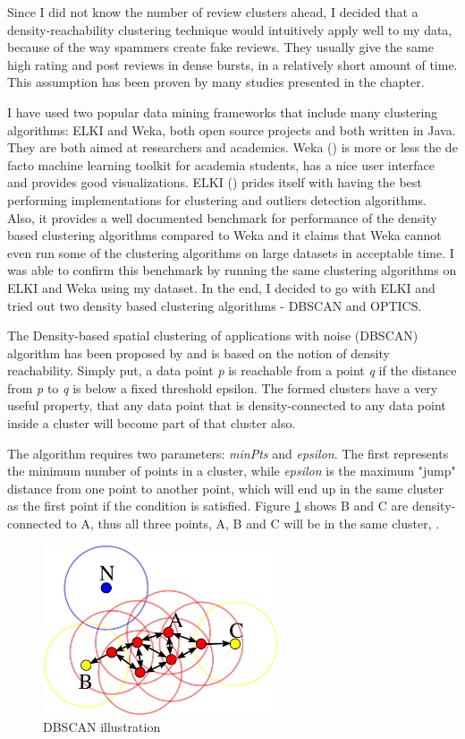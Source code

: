 Since I did not know the number of review clusters ahead, I decided that a density-reachability clustering technique would intuitively apply well to my data, because of the way spammers create fake reviews. They usually give the same high rating and post reviews in dense bursts, in a relatively short amount of time. This assumption has been proven by many studies presented in the  chapter. 

I have used two popular data mining frameworks that include many clustering algorithms: ELKI and Weka, both open source projects and both written in Java. They are both aimed at researchers and academics. Weka (\citet{WEKA}) is more or less the de facto machine learning toolkit for academia students, has a nice user interface and provides good visualizations. ELKI (\citet{ELKI}) prides itself with having the best performing implementations for clustering and outliers detection algorithms. Also, it provides a well documented benchmark for performance of the density based clustering algorithms compared to Weka and it claims that Weka cannot even run some of the clustering algorithms on large datasets in acceptable time. I was able to confirm this benchmark by running the same clustering algorithms on ELKI and Weka using my dataset. In the end, I decided to go with ELKI and tried out two density based clustering algorithms - DBSCAN and OPTICS.

The Density-based spatial clustering of applications with noise (DBSCAN) algorithm has been proposed by \citet{Ester96} and is based on the notion of density reachability. Simply put, a data point \textit{p} is reachable from a point \textit{q} if the distance from \textit{p} to \textit{q} is below a fixed threshold epsilon. The formed clusters have a very useful property, that any data point that is density-connected to any data point inside a cluster will become part of that cluster also. 

The algorithm requires two parameters: \textit{minPts} and \textit{epsilon}. The first represents the minimum number of points in a cluster, while \textit{epsilon} is the maximum "jump" distance from one point to another point, which will end up in the same cluster as the first point if the condition is satisfied. Figure \ref{dbscan} shows B and C are density-connected to A, thus all three points, A, B and C will be in the same cluster, \citet{DBSCAN-Illustration}.

\begin{figure}[ht!]
\centering
\includegraphics[width=7cm,height=5cm,keepaspectratio]{figures/dbscan.png}
\caption{DBSCAN illustration}
\label{dbscan}
\end{figure}


